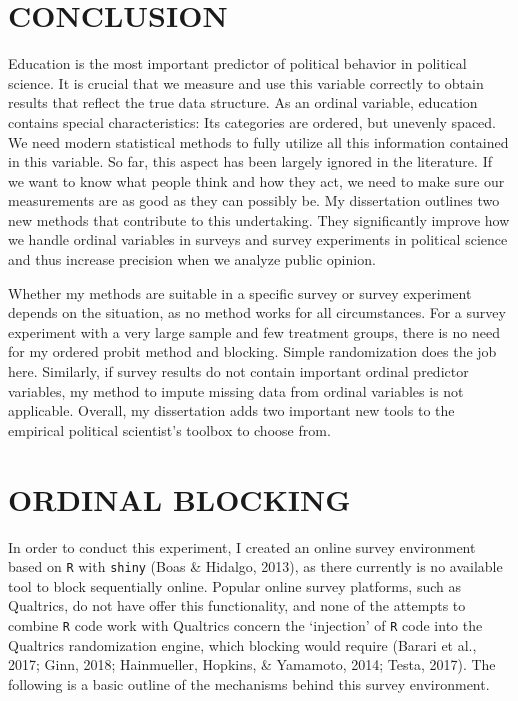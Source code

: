 \documentclass[12pt,econ]{sources/authesis}
\begin{document}
\hypertarget{conclusion}{%
\chapter{CONCLUSION}\label{conclusion}}

Education is the most important predictor of political behavior in political science. It is crucial that we measure and use this variable correctly to obtain results that reflect the true data structure. As an ordinal variable, education contains special characteristics: Its categories are ordered, but unevenly spaced. We need modern statistical methods to fully utilize all this information contained in this variable. So far, this aspect has been largely ignored in the literature. If we want to know what people think and how they act, we need to make sure our measurements are as good as they can possibly be. My dissertation outlines two new methods that contribute to this undertaking. They significantly improve how we handle ordinal variables in surveys and survey experiments in political science and thus increase precision when we analyze public opinion.

Whether my methods are suitable in a specific survey or survey experiment depends on the situation, as no method works for all circumstances. For a survey experiment with a very large sample and few treatment groups, there is no need for my ordered probit method and blocking. Simple randomization does the job here. Similarly, if survey results do not contain important ordinal predictor variables, my method to impute missing data from ordinal variables is not applicable. Overall, my dissertation adds two important new tools to the empirical political scientist's toolbox to choose from.

\appendix

\hypertarget{app-ordblock}{%
\chapter{ORDINAL BLOCKING}\label{app-ordblock}}

In order to conduct this experiment, I created an online survey environment based on \texttt{R} with \texttt{shiny} (Boas \& Hidalgo, 2013), as there currently is no available tool to block sequentially online. Popular online survey platforms, such as Qualtrics, do not have offer this functionality, and none of the attempts to combine \texttt{R} code work with Qualtrics concern the `injection' of \texttt{R} code into the Qualtrics randomization engine, which blocking would require (Barari et al., 2017; Ginn, 2018; Hainmueller, Hopkins, \& Yamamoto, 2014; Testa, 2017). The following is a basic outline of the mechanisms behind this survey environment.
\end{document}
